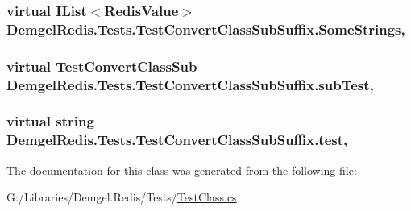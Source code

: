 \subsubsection[{Some\+Strings}]{\setlength{\rightskip}{0pt plus 5cm}virtual I\+List$<$Redis\+Value$>$ Demgel\+Redis.\+Tests.\+Test\+Convert\+Class\+Sub\+Suffix.\+Some\+Strings\hspace{0.3cm}{\ttfamily [get]}, {\ttfamily [set]}}\label{class_demgel_redis_1_1_tests_1_1_test_convert_class_sub_suffix_a037ae9e7b5b90b57c0c6456209a70e62}
\hypertarget{class_demgel_redis_1_1_tests_1_1_test_convert_class_sub_suffix_a8b6d0f2b429ab9a46c5fbf965e089722}{}
\subsubsection[{sub\+Test}]{\setlength{\rightskip}{0pt plus 5cm}virtual {\bf Test\+Convert\+Class\+Sub} Demgel\+Redis.\+Tests.\+Test\+Convert\+Class\+Sub\+Suffix.\+sub\+Test\hspace{0.3cm}{\ttfamily [get]}, {\ttfamily [set]}}\label{class_demgel_redis_1_1_tests_1_1_test_convert_class_sub_suffix_a8b6d0f2b429ab9a46c5fbf965e089722}
\hypertarget{class_demgel_redis_1_1_tests_1_1_test_convert_class_sub_suffix_a4b3c5ca04c0f2317d4ab3d2428cc637c}{}
\subsubsection[{test}]{\setlength{\rightskip}{0pt plus 5cm}virtual string Demgel\+Redis.\+Tests.\+Test\+Convert\+Class\+Sub\+Suffix.\+test\hspace{0.3cm}{\ttfamily [get]}, {\ttfamily [set]}}\label{class_demgel_redis_1_1_tests_1_1_test_convert_class_sub_suffix_a4b3c5ca04c0f2317d4ab3d2428cc637c}


The documentation for this class was generated from the following file\+:\begin{DoxyCompactItemize}
\item 
G\+:/\+Libraries/\+Demgel.\+Redis/\+Tests/\hyperlink{_test_class_8cs}{Test\+Class.\+cs}\end{DoxyCompactItemize}
